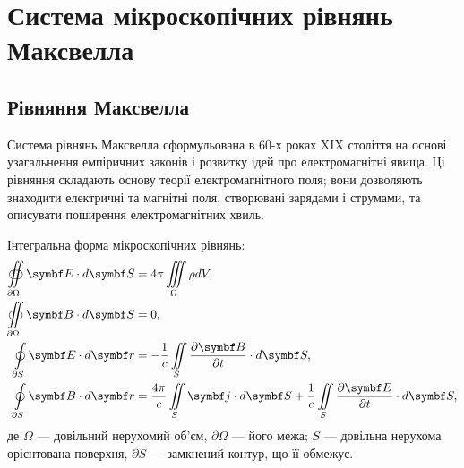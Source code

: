 
\newpage
\chapter{Система \mbox{мікроскопічних} рівнянь Максвелла}


\section{Рівняння Максвелла}

Система рівнянь Максвелла сформульована в 60-х роках XIX століття на основі узагальнення емпіричних
законів і розвитку ідей про електромагнітні явища. Ці рівняння складають основу теорії
електромагнітного поля; вони дозволяють знаходити електричні та магнітні поля, створювані зарядами і
струмами, та описувати поширення електромагнітних хвиль.

Інтегральна форма мікроскопічних рівнянь:
\begin{align}
	\oiint\limits_{\partial\Omega} \Efield\cdot d\vect{S} & = 4\pi\iiint\limits_{\Omega}\rho dV   \label{Int
	I},                                                                                                         \\
	\oiint\limits_{\partial\Omega} \Bfield\cdot d\vect{S} & = 0   \label{Int
	II},                                                                                                                                   \\
	\oint\limits_{\partial S} \Efield\cdot d\vect{r}  & = - \frac1c \iint\limits_S \frac{\partial\Bfield}{\partial t}\cdot d\vect{S}  \label{Int
	III},                                                          \\
	\oint\limits_{\partial S} \Bfield\cdot d\vect{r}  & =\dfrac{4\pi}{c} \iint\limits_S \vect{j}\cdot d\vect{S} +\frac{1}{c} \iint\limits_S
	\frac{\partial\Efield}{\partial t}\cdot d\vect{S}  \label{Int IV},
\end{align}
де $\Omega$ --- довільний нерухомий об'єм, $\partial\Omega$ --- його межа; $S$ --- довільна нерухома орієнтована поверхня, $\partial S$ --- замкнений
контур, що її обмежує.

